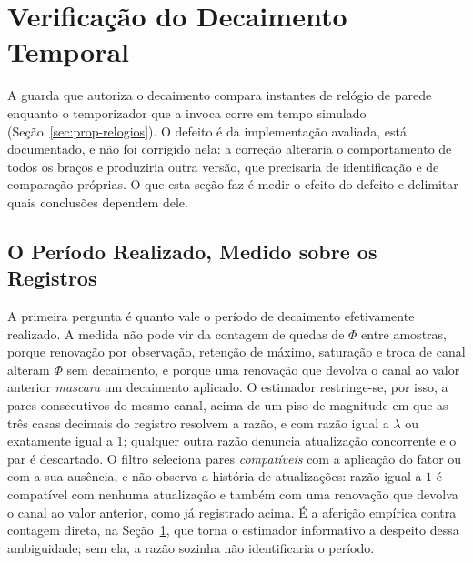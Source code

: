 \section{Verificação do Decaimento Temporal}
\label{sec:res-verificacao-relogio}

A guarda que autoriza o decaimento compara instantes de relógio de parede enquanto o
temporizador que a invoca corre em tempo simulado (Seção~\ref{sec:prop-relogios}). O
defeito é da implementação avaliada, está documentado, e não foi corrigido nela: a
correção alteraria o comportamento de todos os braços e produziria outra versão, que
precisaria de identificação e de comparação próprias. O que esta seção faz é medir o
efeito do defeito e delimitar quais conclusões dependem dele.

\subsection{O Período Realizado, Medido sobre os Registros}

A primeira pergunta é quanto vale o período de decaimento efetivamente realizado. A
medida não pode vir da contagem de quedas de $\Phi$ entre amostras, porque renovação
por observação, retenção de máximo, saturação e troca de canal alteram $\Phi$ sem
decaimento, e porque uma renovação que devolva o canal ao valor anterior
\emph{mascara} um decaimento aplicado. O estimador restringe-se, por isso, a pares
consecutivos do mesmo canal, acima de um piso de magnitude em que as três casas decimais
do registro resolvem a razão, e com razão igual a $\lambda$ ou exatamente igual a $1$;
qualquer outra razão denuncia atualização concorrente e o par é descartado. O filtro
seleciona pares \emph{compatíveis} com a aplicação do fator ou com a sua ausência, e não
observa a história de atualizações: razão igual a $1$ é compatível com nenhuma
atualização e também com uma renovação que devolva o canal ao valor anterior, como já
registrado acima. É a aferição empírica contra contagem direta, na
Seção~\ref{sec:res-verificacao-relogio}, que torna o estimador informativo a despeito
dessa ambiguidade; sem ela, a razão sozinha não identificaria o período.

